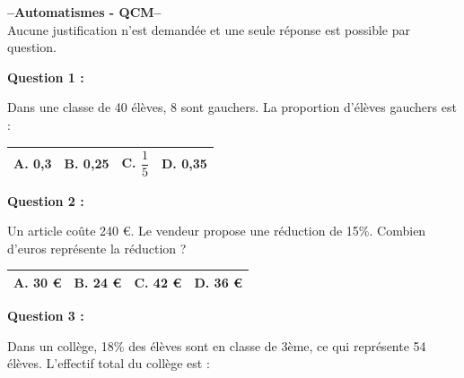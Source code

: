 \documentclass[12pt,a4paper]{article}
\begin{document}
\begin{center}
    \Large \textbf{--Automatismes - QCM--} \\[5pt]
    \normalsize Aucune justification n'est demandée et une seule réponse est possible par question.
\end{center}

\vspace{0.7cm}

\textbf{Question 1 :}
\vspace{5pt}

Dans une classe de 40 élèves, 8 sont gauchers. La proportion d'élèves gauchers est :
\vspace{0.3cm}

\renewcommand{\arraystretch}{3}
\begin{tabular}{|m{3.4cm}|m{3.4cm}|m{3.4cm}|m{3.4cm}|}
\hline
\centering \vspace{-0.3cm} \textbf{A.} 0,3 & 
\centering \vspace{-0.3cm} \textbf{B.} 0,25 & 
\centering \vspace{-0.3cm} \textbf{C.} $\dfrac{1}{5}$ & 
\centering \vspace{-0.3cm} \textbf{D.} 0,35 \tabularnewline
\hline
\end{tabular}

\vspace{0.7cm}

\textbf{Question 2 :}
\vspace{5pt}

Un article coûte 240 €. Le vendeur propose une réduction de 15\%. Combien d'euros représente la réduction ?
\vspace{0.3cm}

\renewcommand{\arraystretch}{3}
\begin{tabular}{|m{3.4cm}|m{3.4cm}|m{3.4cm}|m{3.4cm}|}
\hline
\centering \vspace{-0.3cm} \textbf{A.} 30 € & 
\centering \vspace{-0.3cm} \textbf{B.} 24 € & 
\centering \vspace{-0.3cm} \textbf{C.} 42 € & 
\centering \vspace{-0.3cm} \textbf{D.} 36 € \tabularnewline
\hline
\end{tabular}

\vspace{0.7cm}

\textbf{Question 3 :}
\vspace{5pt}

Dans un collège, 18\% des élèves sont en classe de 3ème, ce qui représente 54 élèves. L'effectif total du collège est :
\vspace{0.3cm}
\end{document}
